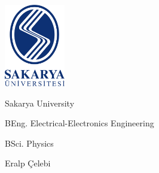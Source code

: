 \documentclass{report}
\author{Eralp Çelebi}
\begin{document}
	
	\begin{titlepage}
		\centering
		
		\hfill \includegraphics[width=75pt, keepaspectratio=true]{logo} \par
		
		\vspace{ 10 \baselineskip }
		
		{\huge Sakarya University}
		
		\vspace{ 4 \baselineskip }
		
		{\large BEng. Electrical-Electronics Engineering}
		
		\vspace{ 1 \baselineskip }
		
		{\large BSci. Physics}
				
		\vspace{ 4 \baselineskip }
		
		{\large Eralp Çelebi}
		
        \vfill
		
	\end{titlepage}
	
	\pagestyle{fancyplain}
	\fancyhead{}
	
	
	\tableofcontents
	\newpage
	            
    
\end{document}
